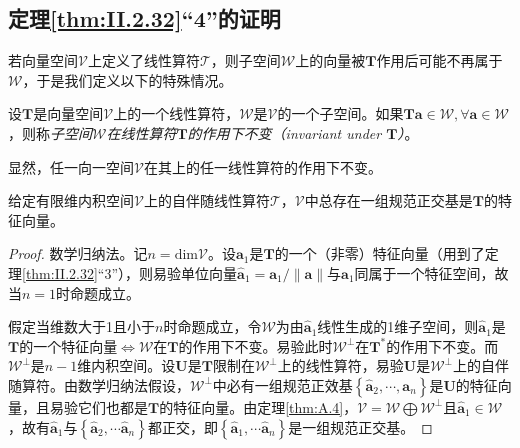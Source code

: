 \documentclass[main.tex]{subfiles}
\begin{document}
\subsection{定理\ref{thm:II.2.32}“4”的证明}
若向量空间$\mathcal{V}$上定义了线性算符$\mathcal{T}$，则子空间$\mathcal{W}$上的向量被$\mathbf{T}$作用后可能不再属于$\mathcal{W}$，于是我们定义以下的特殊情况。

\begin{definition}[子空间在线性算符的作用下不变]
    设$\mathbf{T}$是向量空间$\mathcal{V}$上的一个线性算符，$\mathcal{W}$是$\mathcal{V}$的一个子空间。如果$\mathbf{Ta}\in\mathcal{W},\forall\mathbf{a}\in\mathcal{W}$，则称\emph{子空间$\mathcal{W}$在线性算符$\mathbf{T}$的作用下不变（invariant under $\mathbf{T}$）}。
\end{definition}

显然，任一向一空间$\mathcal{V}$在其上的任一线性算符的作用下不变。

\begin{theorem}
    给定有限维内积空间$\mathcal{V}$上的自伴随线性算符$\mathcal{T}$，$\mathcal{V}$中总存在一组规范正交基是$\mathbf{T}$的特征向量。
\end{theorem}
\begin{proof}
    数学归纳法。记$n=\mathrm{dim}\mathcal{V}$。设$\mathbf{a}_1$是$\mathbf{T}$的一个（非零）特征向量（用到了定理\ref{thm:II.2.32}“3”），则易验单位向量$\mathbf{\hat{a}}_1=\mathbf{a}_1/\left\|\mathbf{a}\right\|$与$\mathbf{a}_1$同属于一个特征空间，故当$n=1$时命题成立。

    假定当维数大于1且小于$n$时命题成立，令$\mathcal{W}$为由$\mathbf{\hat{a}}_1$线性生成的1维子空间，则$\mathbf{\hat{a}}_1$是$\mathbf{T}$的一个特征向量$\Leftrightarrow\mathcal{W}$在$\mathbf{T}$的作用下不变。易验此时$\mathcal{W}^\perp$在$\mathbf{T}^*$的作用下不变。而$\mathcal{W}^\perp$是$n-1$维内积空间。设$\mathbf{U}$是$\mathbf{T}$限制在$\mathcal{W}^\perp$上的线性算符，易验$\mathbf{U}$是$\mathcal{W}^\perp$上的自伴随算符。由数学归纳法假设，$\mathcal{W}^\perp$中必有一组规范正效基$\left\{\mathbf{\hat{a}}_2,\cdots,\mathbf{a}_n\right\}$是$\mathbf{U}$的特征向量，且易验它们也都是$\mathbf{T}$的特征向量。由定理\ref{thm:A.4}，$\mathcal{V}=\mathcal{W}\bigoplus\mathcal{W}^\perp$且$\mathbf{\hat{a}}_1\in\mathcal{W}$，故有$\mathbf{\hat{a}}_1$与$\left\{\mathbf{\hat{a}}_2,\cdots\mathbf{\hat{a}}_n\right\}$都正交，即$\left\{\mathbf{\hat{a}}_1,\cdots\mathbf{\hat{a}}_n\right\}$是一组规范正交基。
\end{proof}
\end{document}
